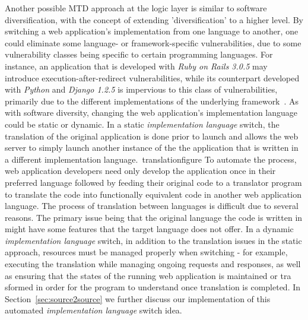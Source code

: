 Another possible MTD approach at the logic layer is similar to software diversification, with the concept of extending 'diversification' to a higher level. By switching a web application's implementation from one language to another, one could eliminate some language- or framework-specific vulnerabilities, due to some vulnerability classes being specific to certain programming languages.
For instance, an application that is developed with \emph{Ruby on Rails 3.0.5} may introduce execution-after-redirect vulnerabilities,
while its counterpart developed with \emph{Python} and \emph{Django 1.2.5} is impervious to this class of vulnerabilities, primarily due to the different implementations of the underlying framework~\cite{doupe2011fear}.
As with software diversity, changing the web application's implementation language could be static or dynamic.
In a static \emph{implementation language} switch, the translation of the original application is done prior to launch and allows the web server to simply launch another instance of the the application that is written in a different implementation language.~\figurename{translationfigure}
To automate the process, web application developers need only develop the application once in their preferred language followed by feeding their original code to a translator program to translate the code into functionally equivalent code in another web application language.
The process of translation between languages is difficult due to several reasons. The primary issue being that the original language the code is written in might have some features that the target language does not offer.
In a dynamic \emph{implementation language} switch, in addition to the translation issues in the static approach, resources must be managed properly when switching - for example, executing the translation while managing ongoing requests and responses, as well as ensuring that the states of the running web application is maintained or tra sformed in order for the program to understand once translation is completed.
In Section~\ref{sec:source2source} we further discuss our implementation of this automated \emph{implementation language} switch idea.



